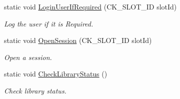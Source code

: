 \begin{DoxyCompactItemize}
static void \hyperlink{class_gost_crypt_1_1_security_token_a90d9d58238c02864ef65b0db824f63d3}{Login\+User\+If\+Required} (C\+K\+\_\+\+S\+L\+O\+T\+\_\+\+ID slot\+Id)
\begin{DoxyCompactList}\small\item\em Log the user if it is Required. \end{DoxyCompactList}\item 
static void \hyperlink{class_gost_crypt_1_1_security_token_a259db94c79db5c606ff74676b0941b12}{Open\+Session} (C\+K\+\_\+\+S\+L\+O\+T\+\_\+\+ID slot\+Id)
\begin{DoxyCompactList}\small\item\em Open a session. \end{DoxyCompactList}\item 
static void \hyperlink{class_gost_crypt_1_1_security_token_aacb372a5fbd24dfc169ca855bf19230c}{Check\+Library\+Status} ()
\begin{DoxyCompactList}\small\item\em Check library status. \end{DoxyCompactList}\end{DoxyCompactItemize}
